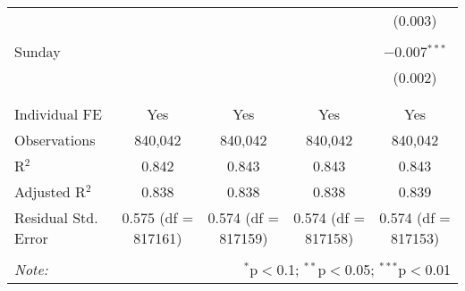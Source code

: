 \documentclass[
]{article}
\begin{document}
\begin{table}[!htbp]
{\begin{tabular}{@{\extracolsep{5pt}}lcccc}
  &  &  &  & (0.003) \\ 
  & & & & \\ 
 Sunday &  &  &  & $-$0.007$^{***}$ \\ 
  &  &  &  & (0.002) \\ 
  & & & & \\ 
\hline \\[-1.8ex] 
Individual FE & Yes & Yes & Yes & Yes \\ 
Observations & 840,042 & 840,042 & 840,042 & 840,042 \\ 
R$^{2}$ & 0.842 & 0.843 & 0.843 & 0.843 \\ 
Adjusted R$^{2}$ & 0.838 & 0.838 & 0.838 & 0.839 \\ 
Residual Std. Error & 0.575 (df = 817161) & 0.574 (df = 817159) & 0.574 (df = 817158) & 0.574 (df = 817153) \\ 
\hline 
\hline \\[-1.8ex] 
\textit{Note:}  & \multicolumn{4}{r}{$^{*}$p$<$0.1; $^{**}$p$<$0.05; $^{***}$p$<$0.01} \\ 
\end{tabular}
} 
\end{table} 
\newpage
\end{document}
